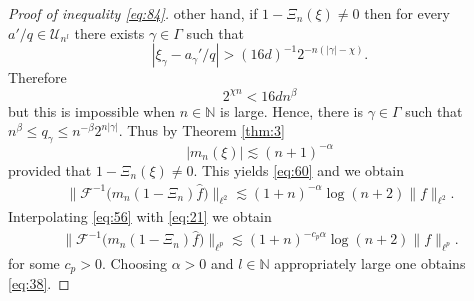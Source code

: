 \documentclass[a4paper,oneside]{amsart}
\theoremstyle{plain}
\theoremstyle{definition}
\numberwithin{equation}{section}
\newcounter{thm}
\theoremstyle{plain}
\newcommand{\NN}{\mathbb{N}}
\newcommand{\8}{\infty}
\begin{document}
\begin{proof}[Proof of inequality \eqref{eq:84}]
other hand, if $1-\Xi_{n}(\xi)\not=0$ then for every
$a'/q\in\mathscr U_{n^l}$ there exists $\gamma\in\Gamma$ such that
\[
|\xi_{\gamma}-a_{\gamma}'/q|>(16d)^{-1} 2^{-n(|\gamma|-\chi)}.
\] 
Therefore
\[
2^{\chi n}<16dn^{\beta}
\] 
 but this is impossible when $n\in\NN$ is large.
Hence, there is
$\gamma\in\Gamma$ such that $n^{\beta}\le q_{\gamma }\le
n^{-\beta}2^{n|\gamma|}$. Thus by Theorem \ref{thm:3}  
\[
|m_n(\xi)|\lesssim (n+1)^{-\alpha}
\]
provided that $1-\Xi_{n}(\xi)\not=0$. This yields \eqref{eq:60} and we
obtain
\begin{align}
\label{eq:56}  
\big\|\mathcal
  F^{-1}\big(m_n(1-\Xi_{n})\hat{f}\big)\big\|_{\ell^2}\lesssim(1+n)^{-\alpha} \log (n+2)\|f\|_{\ell^2}.
\end{align}
Interpolating \eqref{eq:56} with \eqref{eq:21} we obtain 
\begin{align}
\label{eq:57}  
 \big\|\mathcal F^{-1}\big(m_n(1-\Xi_{n})\hat{f}\big)\big\|_{\ell^p}\lesssim(1+n)^{-c_p\alpha} \log (n+2)\|f\|_{\ell^p}.
\end{align}
for some $c_p>0$. Choosing $\alpha>0$ and $l\in\NN$ appropriately
large one obtains \eqref{eq:38}. 


\end{proof}
\end{document}
